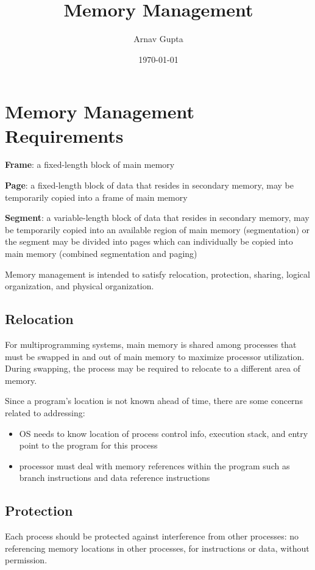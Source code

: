 \documentclass[11pt]{article}
\author{Arnav Gupta}
\date{\today}
\title{Memory Management}
\begin{document}
\maketitle
\tableofcontents

\section{Memory Management Requirements}
\label{sec:orgabb0100}
\textbf{Frame}: a fixed-length block of main memory

\textbf{Page}: a fixed-length block of data that resides in secondary memory, may be temporarily
copied into a frame of main memory

\textbf{Segment}: a variable-length block of data that resides in secondary memory, may be
temporarily copied into an available region of main memory (segmentation) or the segment
may be divided into pages which can individually be copied into main memory (combined
segmentation and paging)

Memory management is intended to satisfy relocation, protection, sharing, logical
organization, and physical organization.
\subsection{Relocation}
\label{sec:org2388b23}
For multiprogramming systems, main memory is shared among processes that must be
swapped in and out of main memory to maximize processor utilization.
During swapping, the process may be required to relocate to a different area of memory.

Since a program's location is not known ahead of time, there are some concerns related
to addressing:
\begin{itemize}
\item OS needs to know location of process control info, execution stack, and entry point
to the program for this process
\item processor must deal with memory references within the program such as branch
instructions and data reference instructions
\end{itemize}
\subsection{Protection}
\label{sec:org0728a61}
Each process should be protected against interference from other processes: no
referencing memory locations in other processes, for instructions or data,
without permission.
\end{document}
